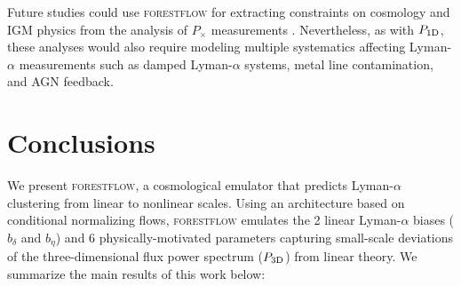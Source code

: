 \documentclass{aa}
\newcommand{\lya}{Lyman-$\alpha$\xspace}
\newcommand{\pcross}{$P_{\times}$\xspace}
\newcommand{\poned}{\ensuremath{P_{\rm 1D}}\xspace}
\newcommand{\pthreed}{\ensuremath{P_{\rm 3D}}\xspace}
\newcommand{\forestflow}{\textsc{forestflow}\xspace}
\begin{document}
Future studies could use \forestflow for extracting constraints on cosmology and IGM physics from the analysis of \pcross measurements \citep[e.g.;][]{Karim2023}. Nevertheless, as with \poned, these analyses would also require modeling multiple systematics affecting \lya measurements such as damped \lya systems, metal line contamination, and AGN feedback.



\section{Conclusions}
\label{sec:conclusions}

We present \forestflow, a cosmological emulator that predicts \lya clustering from linear to nonlinear scales. Using an architecture based on conditional normalizing flows, \forestflow emulates the 2 linear \lya biases ($b_\delta$ and $b_\eta$) and 6 physically-motivated parameters capturing small-scale deviations of the three-dimensional flux power spectrum (\pthreed) from linear theory. We summarize the main results of this work below:
\end{document}
